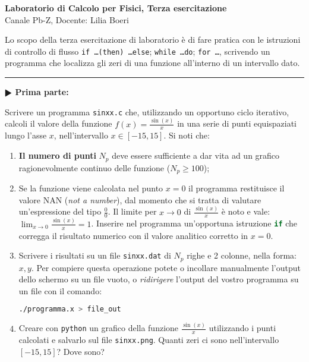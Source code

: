 \documentclass[11pt]{article}
\begin{document}
\pagestyle{empty}

\begin{center}
{\Large \bf  Laboratorio di Calcolo per Fisici, Terza esercitazione\\[2mm]}
{\large Canale Pb-Z, Docente: Lilia Boeri}
\end{center}
\vspace{4mm}

\begin{mdframed}[backgroundcolor=panna]
  Lo scopo della terza esercitazione di laboratorio \`e di fare pratica con
  le istruzioni di controllo di flusso \texttt{if \ldots (then) \ldots else}; \texttt{while \ldots do};
\texttt{for \ldots}, scrivendo un programma che localizza gli zeri di una funzione
all'interno di un intervallo dato.
  \end{mdframed}
%
%

\hrule
\vspace{2mm}
\textbf{$\RHD$ Prima parte:}

Scrivere un programma \texttt{sinxx.c} che, utilizzando un opportuno ciclo iterativo,
calcoli il valore della funzione $f(x)=\frac{\sin(x)}{x}$ in una serie di
punti equispaziati lungo l'asse $x$, nell'intervallo $x \in \left[-15,15 \right]$.
Si noti che:
\begin{enumerate}
\item  {\bf Il numero di punti} $N_{p}$ deve essere sufficiente a dar vita ad un grafico ragionevolmente continuo delle funzione ($N_p \ge 100$);
\item Se la funzione viene calcolata nel punto $x=0$ il programma restituisce il valore NAN (\emph{not a number}), 
dal momento che si tratta di valutare un'espressione del tipo $\frac{0}{0}$. Il limite per $x \to 0$ di 
$\frac{\sin(x)}{x}$ \`e noto e vale: $\lim_{x \to 0} \frac{\sin(x)}{x} = 1$.
Inserire nel programma un'opportuna  istruzione \lstinline[language=c]{if} che corregga il risultato numerico con il valore analitico corretto in $x=0$.
\item Scrivere i risultati su un file \texttt{sinxx.dat} di $N_p$ righe e 2 colonne, nella forma: $x,y$. Per compiere questa operazione potete o incollare manualmente l'output dello schermo su un file vuoto, o {\em ridirigere\/} l'output
del vostro programma su un file con il comando:
\\
\begin{lstlisting}[numbers=none,language=bash]
./programma.x > file_out
\end{lstlisting}
\item Creare con \texttt{python} un grafico della funzione $\frac{\sin(x)}{x}$
utilizzando i punti calcolati e salvarlo sul file \texttt{sinxx.png}. 
 Quanti zeri ci sono nell'intervallo $\left[ -15,15 \right]$? Dove sono?
\end{enumerate}
\end{document}
